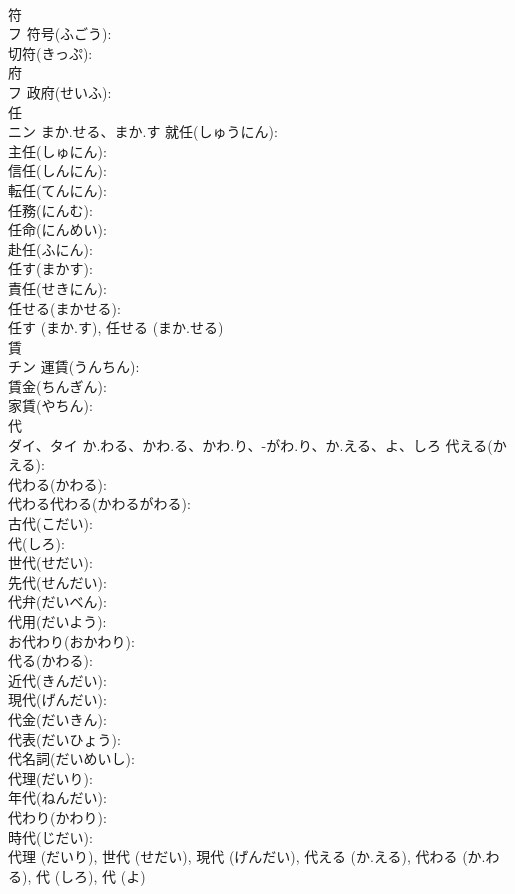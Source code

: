 \documentclass[8pt]{extreport}
\begin{document}
\begin{CJK}{UTF8}{min}
\\	符			
\\	フ		符号(ふごう): 
\\	切符(きっぷ): 
\\	府			
\\	フ		政府(せいふ): 
\\	任			
\\	ニン	まか.せる、まか.す	就任(しゅうにん): 
\\	主任(しゅにん): 
\\	信任(しんにん): 
\\	転任(てんにん): 
\\	任務(にんむ): 
\\	任命(にんめい): 
\\	赴任(ふにん): 
\\	任す(まかす): 
\\	責任(せきにん): 
\\	任せる(まかせる): 
\\	任す (まか.す), 任せる (まか.せる)
\\	賃			
\\	チン		運賃(うんちん): 
\\	賃金(ちんぎん): 
\\	家賃(やちん): 
\\	代			
\\	ダイ、タイ	か.わる、かわ.る、かわ.り、-がわ.り、か.える、よ、しろ	代える(かえる): 
\\	代わる(かわる): 
\\	代わる代わる(かわるがわる): 
\\	古代(こだい): 
\\	代(しろ): 
\\	世代(せだい): 
\\	先代(せんだい): 
\\	代弁(だいべん): 
\\	代用(だいよう): 
\\	お代わり(おかわり): 
\\	代る(かわる): 
\\	近代(きんだい): 
\\	現代(げんだい): 
\\	代金(だいきん): 
\\	代表(だいひょう): 
\\	代名詞(だいめいし): 
\\	代理(だいり): 
\\	年代(ねんだい): 
\\	代わり(かわり): 
\\	時代(じだい): 
\\	代理 (だいり), 世代 (せだい), 現代 (げんだい), 代える (か.える), 代わる (か.わる), 代 (しろ), 代 (よ)

\end{CJK}
\end{document}
